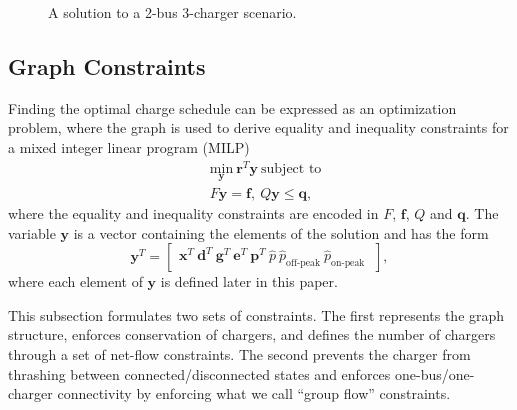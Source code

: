 \begin{figure}
	\caption{A solution to a 2-bus 3-charger scenario.}
	\label{fig:graphWithSolution}
\end{figure}

\subsection{Graph Constraints}
\par Finding the optimal charge schedule can be expressed as an optimization problem, where the graph is used to derive equality and inequality constraints for a mixed integer linear program (MILP)
\begin{equation}
	\begin{aligned}
		& \underset{\mathbf{y}}{\text{min}}\ \mathbf{r}^T\mathbf{y} \ \text{subject to} \\
		& F\mathbf{y} = \mathbf{f}, \ Q\mathbf{y} \le \mathbf{q},
	\end{aligned}
\end{equation}
where the equality and inequality constraints are encoded in $F$, $\mathbf{f}$, $Q$ and $\mathbf{q}$. The variable $\mathbf{y}$ is a vector containing the elements of the solution and has the form 
\begin{equation}\label{eqn:y}
		\mathbf{y}^T = \begin{bmatrix}
		\mathbf{x}^T  \
		\mathbf{d}^T  \
		\mathbf{g}^T  \
		\mathbf{e}^T  \
		\mathbf{p}^T  \
		\hat{p}  \
		\hat{p}_\text{off-peak}  \
		\hat{p}_\text{on-peak}  \
	\end{bmatrix},
\end{equation}
where each element of $\mathbf{y}$ is defined later in this paper.
\par  This subsection formulates two sets of constraints.  The first represents the graph structure, enforces conservation of chargers, and defines the number of chargers through a set of net-flow constraints. The second prevents the charger from thrashing between connected/disconnected states and enforces one-bus/one-charger connectivity by enforcing what we call ``group flow'' constraints.
